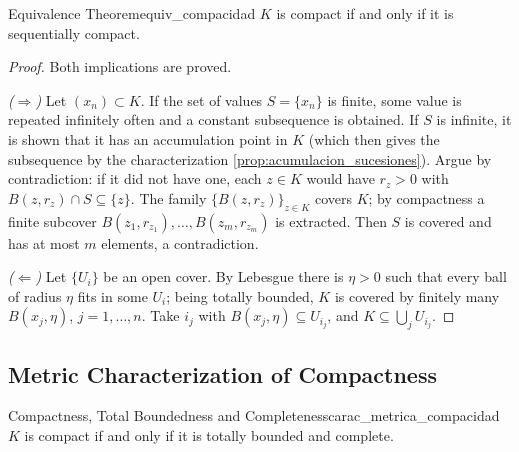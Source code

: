 \documentclass[11pt, a4paper]{article}
\begin{document}
\begin{teorema}{Equivalence Theorem}{equiv_compacidad}
$K$ is compact if and only if it is sequentially compact.
\end{teorema}

\begin{proof}
Both implications are proved.

\textit{($\Rightarrow$)} Let $(x_n) \subset K$.
If the set of values $S = \{x_n\}$ is finite, some value is repeated infinitely often
and a constant subsequence is obtained.
If $S$ is infinite, it is shown that it has an accumulation point in $K$
(which then gives the subsequence by the characterization \ref{prop:acumulacion_sucesiones}).
Argue by contradiction: if it did not have one, each $z \in K$ would have $r_z > 0$ with
$B(z, r_z) \cap S \subseteq \{z\}$.
The family $\{B(z, r_z)\}_{z \in K}$ covers $K$; by compactness a
finite subcover $B(z_1, r_{z_1}), \dots, B(z_m, r_{z_m})$ is extracted.
Then $S$ is covered and has at most $m$ elements, a contradiction.

\textit{($\Leftarrow$)} Let $\{U_i\}$ be an open cover.
By Lebesgue there is $\eta > 0$ such that every ball of radius $\eta$ fits in some $U_i$;
being totally bounded, $K$ is covered by finitely many $B(x_j, \eta)$, $j = 1, \dots, n$.
Take $i_j$ with $B(x_j, \eta) \subseteq U_{i_j}$, and $K \subseteq \bigcup_j U_{i_j}$.
\end{proof}

\subsection{Metric Characterization of Compactness}

\begin{teorema}{Compactness, Total Boundedness and Completeness}{carac_metrica_compacidad}
$K$ is compact if and only if it is totally bounded and complete.
\end{teorema}
\end{document}
